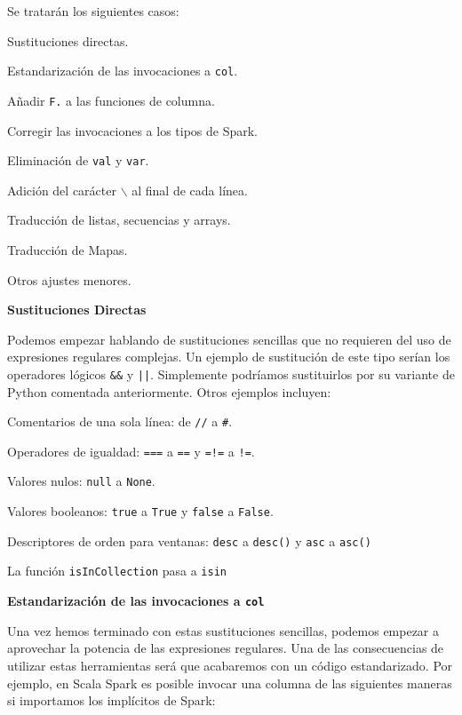 \documentclass[12pt,twoside,titlepage]{report}
\begin{document}
Se tratarán los siguientes casos:

\begin{compactitem}
	\item Sustituciones directas.
	\item Estandarización de las invocaciones a \texttt{col}.
	\item Añadir \texttt{F.} a las funciones de columna.
	\item Corregir las invocaciones a los tipos de Spark.
	\item Eliminación de \texttt{val} y \texttt{var}.
	\item Adición del carácter \texttt{$\backslash$} al final de cada línea.
	\item Traducción de listas, secuencias y arrays.
	\item Traducción de Mapas.
	\item Otros ajustes menores.
\end{compactitem}


\textbf{Sustituciones Directas}

Podemos empezar hablando de sustituciones sencillas que no requieren del uso de expresiones regulares complejas. Un ejemplo de sustitución de este tipo serían los operadores lógicos \texttt{\&\&} y \texttt{||}. Simplemente podríamos sustituirlos por su variante de Python comentada anteriormente. Otros ejemplos incluyen:

\begin{compactitem}
	\item Comentarios de una sola línea: de \texttt{//} a \texttt{\#}.
	\item Operadores de igualdad: \texttt{===} a \texttt{==} y \texttt{=!=} a \texttt{!=}.
	\item Valores nulos: \texttt{null} a \texttt{None}.
	\item Valores booleanos: \texttt{true} a \texttt{True} y \texttt{false} a \texttt{False}.
	\item Descriptores de orden para ventanas: \texttt{desc} a \texttt{desc()} y \texttt{asc} a \texttt{asc()}
	\item La función \texttt{isInCollection} pasa a \texttt{isin}
\end{compactitem}


\textbf{Estandarización de las invocaciones a \texttt{col}}

Una vez hemos terminado con estas sustituciones sencillas, podemos empezar a aprovechar la potencia de las expresiones regulares. Una de las consecuencias de utilizar estas herramientas será que acabaremos con un código estandarizado. Por ejemplo, en Scala Spark es posible invocar una columna de las siguientes maneras si importamos los implícitos de Spark:
\end{document}
